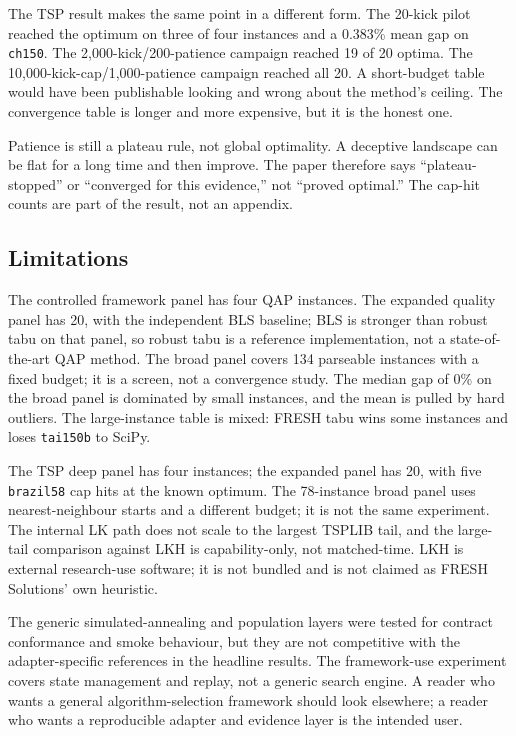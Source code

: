 \documentclass[11pt]{article}
\begin{document}
The TSP result makes the same point in a different form. The 20-kick pilot reached the optimum on three of four instances and a
0.383\% mean gap on \texttt{ch150}. The 2,000-kick/200-patience campaign reached 19 of 20 optima. The
10,000-kick-cap/1,000-patience campaign reached all 20. A short-budget table would have been publishable
looking and wrong about the method's ceiling. The convergence table is longer and more expensive, but
it is the honest one.

Patience is still a plateau rule, not global optimality. A deceptive landscape can be flat for a long
time and then improve. The paper therefore says “plateau-stopped” or “converged for this evidence,”
not “proved optimal.” The cap-hit counts are part of the result, not an appendix.

\subsection{Limitations}

The controlled framework panel has four QAP instances. The expanded quality panel has 20, with the
independent BLS baseline; BLS is stronger than robust tabu on that panel, so robust tabu is a
reference implementation, not a state-of-the-art QAP method. The broad panel covers 134 parseable
instances with a fixed budget; it is a screen, not a convergence study. The median gap of 0\% on the
broad panel is dominated by small instances, and the mean is pulled by hard outliers. The
large-instance table is mixed: FRESH tabu wins some instances and loses \texttt{tai150b} to SciPy.

The TSP deep panel has four instances; the expanded panel has 20, with five \texttt{brazil58} cap hits at the
known optimum. The 78-instance broad panel uses nearest-neighbour starts and a different budget; it
is not the same experiment. The internal LK path does not scale to
the largest TSPLIB tail, and the large-tail comparison against LKH is capability-only, not
matched-time. LKH is external research-use software; it is not bundled and is not claimed as FRESH
Solutions' own heuristic.

The generic simulated-annealing and population layers were tested for contract conformance and smoke
behaviour, but they are not competitive with the adapter-specific references in the headline results.
The framework-use experiment covers state management and replay, not a generic search engine. A reader
who wants a general algorithm-selection framework should look elsewhere; a reader who wants a
reproducible adapter and evidence layer is the intended user.
\end{document}
